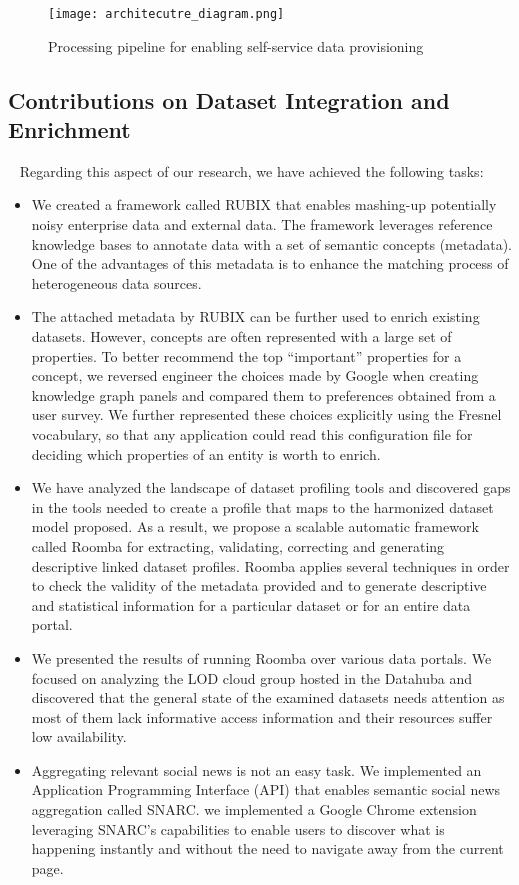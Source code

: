 \begin{figure}[!ht]
  \centering
  \texttt{[image: architecutre\_diagram.png]}
  \caption{Processing pipeline for enabling self-service data provisioning}
  \label{fig:architecutre_diagram}
\end{figure}

\subsection{Contributions on Dataset Integration and Enrichment}~
Regarding this aspect of our research, we have achieved the following tasks:
 \begin{itemize}
  \item We created a framework called RUBIX that enables mashing-up potentially noisy enterprise data and external data. The framework leverages reference knowledge bases to annotate data with a set of semantic concepts (metadata). One of the advantages of this metadata is to enhance the matching process of heterogeneous data sources.
	\item The attached metadata by RUBIX can be further used to enrich existing datasets. However, concepts are often represented with a large set of properties. To better recommend the top ``important'' properties for a concept, we reversed engineer the choices made by Google when creating knowledge graph panels and compared them to preferences obtained from a user survey. We further represented these choices explicitly using the Fresnel vocabulary, so that any application could read this configuration file for deciding which properties of an entity is worth to enrich.
	\item We have analyzed the landscape of dataset profiling tools and discovered gaps in the tools needed to create a profile that maps to the harmonized dataset model proposed. As a result, we propose a scalable automatic framework called Roomba for extracting, validating, correcting and generating descriptive linked dataset profiles. Roomba applies several techniques in order to check the validity of the metadata provided and to generate descriptive and statistical information for a particular dataset or for an entire data portal.
	\item We presented the results of running Roomba over various data portals. We focused on analyzing the LOD cloud group hosted in the Datahuba and discovered that the general state of the examined datasets needs attention as most of them lack informative access information and their resources suffer low availability.
	\item Aggregating relevant social news is not an easy task. We implemented an Application Programming Interface (API) that enables semantic social news aggregation called SNARC. we implemented a Google Chrome extension leveraging SNARC's capabilities to enable users to discover what is happening instantly and without the need to navigate away from the current page.
\end{itemize}

